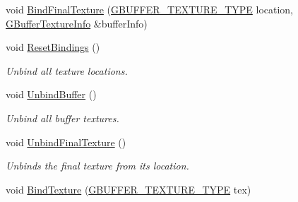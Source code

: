 \begin{DoxyCompactItemize}
\item 
void \mbox{\hyperlink{class_geometry_engine_1_1_geometry_buffer_1_1_g_buffer_a710627a05fa69f6aa98ee6d90ab57e85}{Bind\+Final\+Texture}} (\mbox{\hyperlink{class_geometry_engine_1_1_geometry_buffer_1_1_g_buffer_a718dceafcac1915f7de061108597e1cc}{G\+B\+U\+F\+F\+E\+R\+\_\+\+T\+E\+X\+T\+U\+R\+E\+\_\+\+T\+Y\+PE}} location, \mbox{\hyperlink{struct_geometry_engine_1_1_g_buffer_texture_info}{G\+Buffer\+Texture\+Info}} \&buffer\+Info)
\item 
\mbox{\label{class_geometry_engine_1_1_geometry_buffer_1_1_g_buffer_a1ef28cc887dbd56d20ae4df0617b8eb1}} 
void \mbox{\hyperlink{class_geometry_engine_1_1_geometry_buffer_1_1_g_buffer_a1ef28cc887dbd56d20ae4df0617b8eb1}{Reset\+Bindings}} ()
\begin{DoxyCompactList}\small\item\em Unbind all texture locations. \end{DoxyCompactList}\item 
\mbox{\label{class_geometry_engine_1_1_geometry_buffer_1_1_g_buffer_a2c24808c13f616bcc3ca6ed321277e95}} 
void \mbox{\hyperlink{class_geometry_engine_1_1_geometry_buffer_1_1_g_buffer_a2c24808c13f616bcc3ca6ed321277e95}{Unbind\+Buffer}} ()
\begin{DoxyCompactList}\small\item\em Unbind all buffer textures. \end{DoxyCompactList}\item 
\mbox{\label{class_geometry_engine_1_1_geometry_buffer_1_1_g_buffer_a954286e665d76dc77f352923a3c0b191}} 
void \mbox{\hyperlink{class_geometry_engine_1_1_geometry_buffer_1_1_g_buffer_a954286e665d76dc77f352923a3c0b191}{Unbind\+Final\+Texture}} ()
\begin{DoxyCompactList}\small\item\em Unbinds the final texture from its location. \end{DoxyCompactList}\item 
void \mbox{\hyperlink{class_geometry_engine_1_1_geometry_buffer_1_1_g_buffer_a6a2469afe0c79b97d35ba5d2b6a1ae52}{Bind\+Texture}} (\mbox{\hyperlink{class_geometry_engine_1_1_geometry_buffer_1_1_g_buffer_a718dceafcac1915f7de061108597e1cc}{G\+B\+U\+F\+F\+E\+R\+\_\+\+T\+E\+X\+T\+U\+R\+E\+\_\+\+T\+Y\+PE}} tex)

\end{DoxyCompactItemize}
